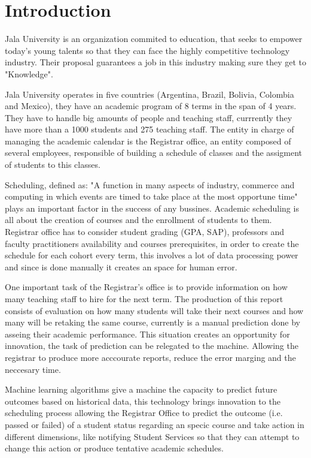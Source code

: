 \section{Introduction}

Jala University is an organization commited to education, that seeks to empower today's young talents so that they can face the highly competitive technology industry. Their proposal guarantees a job in this industry making sure they get to "Knowledge".

Jala University operates in five countries (Argentina, Brazil, Bolivia, Colombia and Mexico), they have an academic program of 8 terms in the span of 4 years. They have to handle big amounts of people and teaching staff, currrently they have more than a 1000 students and 275 teaching staff. The entity in charge of managing the academic calendar is the Registrar office, an entity composed of several employees, responsible of building a schedule of classes and the assigment of students to this classes.

Scheduling, defined as: "A function in many aspects of industry, commerce and computing in which events are timed to take place at the most opportune time" plays an important factor in the success of any bussines. Academic scheduling is all about the creation of courses and the enrollment of students to them. Registrar office has to consider student grading (GPA, SAP), professors and faculty practitioners availability and courses prerequisites, in order to create the schedule for each cohort \textcite{A cohort is a generation of students} every term, this involves a lot of data processing power and since is done manually it creates an space for human error.

One important task of the Registrar's office is to provide information on how many teaching staff to hire for the next term. The production of this report consists of evaluation on how many students will take their next courses and how many will be retaking the same course, currently is a manual prediction done by asseing their academic performance. This situation creates an opportunity for innovation, the task of prediction can be relegated to the machine. Allowing the registrar to produce more acccourate reports, reduce the error marging and the neccesary time.

Machine learning algorithms give a machine the capacity to predict future outcomes based on historical data, this technology brings innovation to the scheduling process allowing the Registrar Office to predict the outcome (i.e. passed or failed) of a student status regarding an specic course and take action in different dimensions, like notifying Student Services so that they can attempt to change this action or produce tentative academic schedules.

